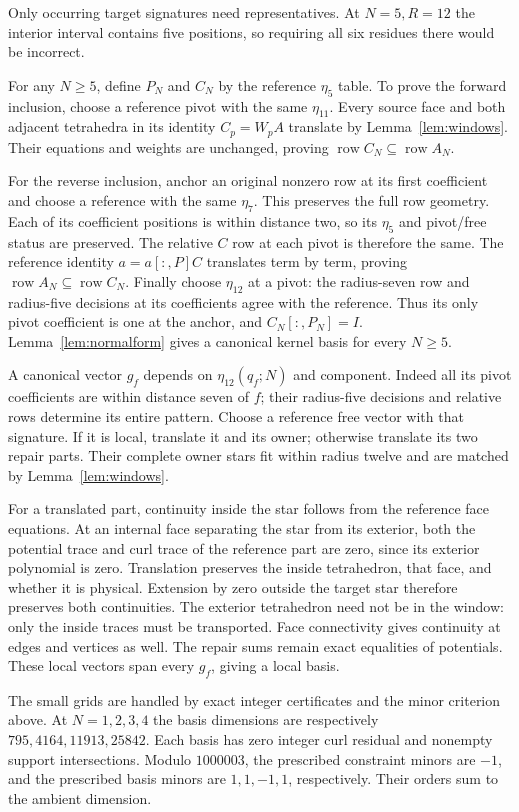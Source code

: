 \documentclass[11pt]{article}
\theoremstyle{remark}
\DeclareMathOperator{\row}{row}
\begin{document}
Only occurring target signatures need representatives. At $N=5,R=12$
the interior interval contains five positions, so requiring all six
residues there would be incorrect.

For any $N\ge5$, define $P_N$ and $C_N$ by the reference $\eta_5$ table.
To prove the forward inclusion, choose a reference pivot with the same
$\eta_{11}$. Every source face and both adjacent tetrahedra in its
identity $C_p=W_pA$ translate by Lemma~\ref{lem:windows}. Their equations
and weights are unchanged, proving $\row C_N\subseteq\row A_N$.

For the reverse inclusion, anchor an original nonzero row at its first
coefficient and choose a reference with the same $\eta_7$. This preserves
the full row geometry. Each of its coefficient positions is within
distance two, so its $\eta_5$ and pivot/free status are preserved.
The relative $C$ row at each pivot is therefore the same. The reference
identity $a=a[:,P]C$ translates term by term, proving
$\row A_N\subseteq\row C_N$. Finally choose $\eta_{12}$ at a pivot:
the radius-seven row and radius-five decisions at its coefficients agree
with the reference. Thus its only pivot coefficient is one at the
anchor, and $C_N[:,P_N]=I$. Lemma~\ref{lem:normalform} gives a canonical
kernel basis for every $N\ge5$.

A canonical vector $g_f$ depends on $\eta_{12}(q_f;N)$ and component.
Indeed all its pivot coefficients are within distance seven of $f$;
their radius-five decisions and relative rows determine its entire
pattern. Choose a reference free vector with that signature. If it is
local, translate it and its owner; otherwise translate its two repair
parts. Their complete owner stars fit within radius twelve and are
matched by Lemma~\ref{lem:windows}.

For a translated part, continuity inside the star follows from the
reference face equations. At an internal face separating the star from
its exterior, both the potential trace and curl trace of the reference
part are zero, since its exterior polynomial is zero. Translation
preserves the inside tetrahedron, that face, and whether it is physical.
Extension by zero outside the target star therefore preserves both
continuities. The exterior tetrahedron need not be in the window: only
the inside traces must be transported. Face connectivity gives continuity
at edges and vertices as well. The repair sums remain exact equalities
of potentials. These local vectors span every $g_f$, giving a local basis.

The small grids are handled by exact integer certificates and the minor
criterion above. At $N=1,2,3,4$ the basis dimensions are respectively
$795,4164,11913,25842$. Each basis has zero integer curl residual and
nonempty support intersections. Modulo $1000003$, the prescribed constraint
minors are $-1$, and the prescribed basis minors are $1,1,-1,1$,
respectively. Their orders sum to the ambient dimension.
\end{document}
